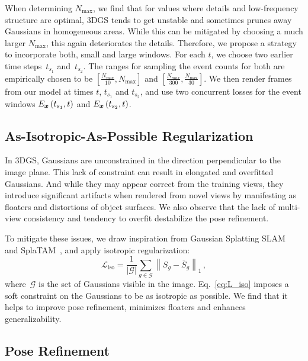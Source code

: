 When determining $N_\mathrm{max}$, we find that for values where details and low-frequency structure are optimal, 3DGS tends to get unstable and sometimes prunes away Gaussians in homogeneous areas.
While this can be mitigated by choosing a much larger $N_\mathrm{max}$, this again deteriorates the details. 
Therefore, we propose a strategy to incorporate both, small and large windows. For each $t$, we choose two earlier time steps~$t_{s_1}$ and~$t_{s_2}$. The ranges for sampling the event counts for both are empirically chosen to be $[\frac{N_\mathrm{max}}{10}, N_\mathrm{max}]$ and $[\frac{N_{max}}{300}, \frac{N_\mathrm{max}}{30}]$. We then render frames from our model at times $t$, $t_{s_1}$ and $t_{s_2}$, and use two concurrent losses for the event windows $E_{\boldsymbol{x}}\left(t_{s_1}, t\right)$ and $E_{\boldsymbol{x}}\left(t_{s_2}, t\right)$. 

\subsection{As-Isotropic-As-Possible Regularization} 
\label{ssec:IsotropicReg} 

In 3DGS, Gaussians are unconstrained in the direction perpendicular to the image plane. 
This lack of constraint can result in elongated and overfitted Gaussians. 
And while they may appear correct from the training views, they introduce significant artifacts when rendered from novel views by manifesting as floaters and distortions of object surfaces. 
We also observe that the lack of multi-view consistency and tendency to overfit destabilize the pose refinement. 

To mitigate these issues, we draw inspiration from Gaussian Splatting SLAM~\cite{3dgsslam} and SplaTAM~\cite{splatam}, and apply isotropic regularization:
\begin{equation}
    \mathcal{L}_{\text{iso}} = \frac{1}{|\mathcal{G}|} \sum_{g \in \mathcal{G}} \left\| S_g - \bar{S}_g \right\|_1
    \label{eq:L_iso} \mathrm{\,,}
\end{equation}
where~$\mathcal{G}$ is the set of Gaussians visible in the image. Eq.~\eqref{eq:L_iso} imposes a soft constraint on the Gaussians to be as isotropic as possible.
We find that it helps to improve pose refinement, minimizes floaters and enhances generalizability. 

\subsection{Pose Refinement} 
\label{sec:pose_refinement}


